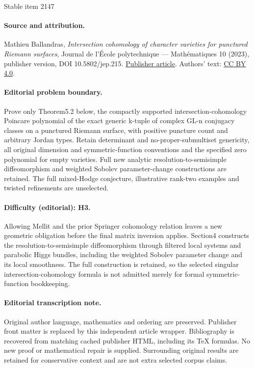 \documentclass[11pt]{article}
\theoremstyle{definition}
\theoremstyle{plain}
\begin{document}
\begin{center}{\Large Stable item 2147}\end{center}
\paragraph{Source and attribution.}
Mathieu Ballandras, \emph{Intersection cohomology of character varieties for punctured Riemann surfaces}, Journal de l’École polytechnique — Mathématiques 10 (2023), publisher version, DOI 10.5802/jep.215. \href{https://jep.centre-mersenne.org/articles/10.5802/jep.215/}{Publisher article}. Authors' text: \href{https://creativecommons.org/licenses/by/4.0/}{CC BY 4.0}.
\paragraph{Editorial problem boundary.}
Prove only Theorem5.2 below, the compactly supported intersection-cohomology Poincare polynomial of the exact generic k-tuple of complex GL-n conjugacy classes on a punctured Riemann surface, with positive puncture count and arbitrary Jordan types. Retain determinant and no-proper-submultiset genericity, all original dimension and symmetric-function conventions and the specified zero polynomial for empty varieties. Full new analytic resolution-to-semisimple diffeomorphism and weighted Sobolev parameter-change constructions are retained. The full mixed-Hodge conjecture, illustrative rank-two examples and twisted refinements are unselected.
\paragraph{Difficulty (editorial): H3.}
Allowing Mellit and the prior Springer cohomology relation leaves a new geometric obligation before the final matrix inversion applies. Section4 constructs the resolution-to-semisimple diffeomorphism through filtered local systems and parabolic Higgs bundles, including the weighted Sobolev parameter change and its local smoothness. The full construction is retained, so the selected singular intersection-cohomology formula is not admitted merely for formal symmetric-function bookkeeping.
\paragraph{Editorial transcription note.}
Original author language, mathematics and ordering are preserved. Publisher front matter is replaced by this independent article wrapper. Bibliography is recovered from matching cached publisher HTML, including its TeX formulas. No new proof or mathematical repair is supplied. Surrounding original results are retained for conservative context and are not extra selected corpus claims.
\clearpage
\end{document}
